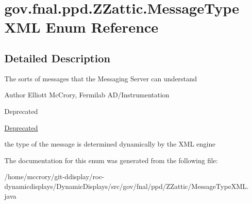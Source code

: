 \hypertarget{enumgov_1_1fnal_1_1ppd_1_1ZZattic_1_1MessageTypeXML}{\section{gov.\-fnal.\-ppd.\-Z\-Zattic.\-Message\-Type\-X\-M\-L Enum Reference}
\label{enumgov_1_1fnal_1_1ppd_1_1ZZattic_1_1MessageTypeXML}
}


\subsection{Detailed Description}
The sorts of messages that the Messaging Server can understand

\begin{DoxyAuthor}{Author}
Elliott Mc\-Crory, Fermilab A\-D/\-Instrumentation 
\end{DoxyAuthor}
\begin{DoxyRefDesc}{Deprecated}
\item[\hyperlink{deprecated__deprecated000017}{Deprecated}]
\begin{DoxyItemize}
\item the type of the message is determined dynamically by the X\-M\-L engine 
\end{DoxyItemize}\end{DoxyRefDesc}


The documentation for this enum was generated from the following file\-:\begin{DoxyCompactItemize}
\item 
/home/mccrory/git-\/ddisplay/roc-\/dynamicdisplays/\-Dynamic\-Displays/src/gov/fnal/ppd/\-Z\-Zattic/Message\-Type\-X\-M\-L.\-java\end{DoxyCompactItemize}
